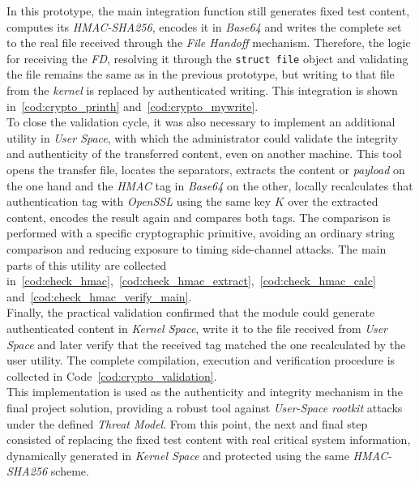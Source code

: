 In this prototype, the main integration function still generates fixed test content, computes its \textit{HMAC-SHA256}, encodes it in \textit{Base64} and writes the complete set to the real file received through the \textit{File Handoff} mechanism.
Therefore, the logic for receiving the \textit{FD}, resolving it through the \texttt{struct file} object and validating the file remains the same as in the previous prototype, but writing to that file from the \textit{kernel} is replaced by authenticated writing.
This integration is shown in~\ref{cod:crypto_printh} and~\ref{cod:crypto_mywrite}.\\

To close the validation cycle, it was also necessary to implement an additional utility in \textit{User Space}, with which the administrator could validate the integrity and authenticity of the transferred content, even on another machine.
This tool opens the transfer file, locates the separators, extracts the content or \textit{payload} on the one hand and the \textit{HMAC} tag in \textit{Base64} on the other, locally recalculates that authentication tag with \textit{OpenSSL} using the same key \(K\) over the extracted content, encodes the result again and compares both tags.
The comparison is performed with a specific cryptographic primitive, avoiding an ordinary string comparison and reducing exposure to timing side-channel attacks.
The main parts of this utility are collected in~\ref{cod:check_hmac},~\ref{cod:check_hmac_extract},~\ref{cod:check_hmac_calc} and~\ref{cod:check_hmac_verify_main}.\\

Finally, the practical validation confirmed that the module could generate authenticated content in \textit{Kernel Space}, write it to the file received from \textit{User Space} and later verify that the received tag matched the one recalculated by the user utility.
The complete compilation, execution and verification procedure is collected in Code~\ref{cod:crypto_validation}.\\

This implementation is used as the authenticity and integrity mechanism in the final project solution, providing a robust tool against \textit{User-Space rootkit} attacks under the defined \textit{Threat Model}.
From this point, the next and final step consisted of replacing the fixed test content with real critical system information, dynamically generated in \textit{Kernel Space} and protected using the same \textit{HMAC-SHA256} scheme.\\\\

